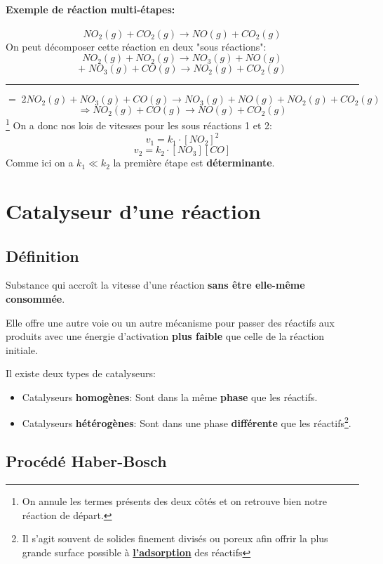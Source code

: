 \documentclass[10pt,a4paper]{book}
\begin{document}
\paragraph{Exemple de réaction multi-étapes:}
\[NO_2(g)+CO_2(g)\longrightarrow NO(g)+CO_2(g)\]
On peut décomposer cette réaction en deux "sous réactions":
\[NO_2(g)+NO_2(g)\longrightarrow NO_3(g)+NO(g) \tag*{1}\]
\[+ \; NO_3(g)+CO(g)\longrightarrow NO_2(g)+CO_2(g) \tag*{2}\]
\hrule
\[= \; 2NO_2(g)+NO_3(g)+CO(g) \longrightarrow NO_3(g)+NO(g)+NO_2(g)+CO_2(g)\]
\[\Rightarrow NO_2(g)+CO(g) \longrightarrow NO(g)+CO_2(g)\]\footnote{On annule les termes présents des deux côtés et on retrouve bien notre réaction de départ.}
On a donc nos lois de vitesses pour les sous réactions 1 et 2:
\[v_1 = k_1 \cdot [NO_2]^2\]
\[v_2 = k_2 \cdot [NO_3][CO]\]
Comme ici on a $k_1 \ll k_2$ la première étape est \textbf{déterminante}.

\section{Catalyseur d'une réaction}

\subsection{Définition}

Substance qui accroît la vitesse d'une réaction \textbf{sans être elle-même consommée}. \par
Elle offre une autre voie ou un autre mécanisme pour passer des réactifs aux produits avec une énergie d'activation \textbf{plus faible} que celle de la réaction initiale. \par
Il existe deux types de catalyseurs:
\begin{itemize}
\item Catalyseurs \textbf{homogènes}: Sont dans la même \textbf{phase} que les réactifs.
\item Catalyseurs \textbf{hétérogènes}: Sont dans une phase \textbf{différente} que les réactifs\footnote{Il s'agit souvent de solides finement divisés ou poreux afin offrir la plus grande surface possible à \href{https://fr.wikipedia.org/wiki/Adsorption}{\textbf{l'adsorption}} des réactifs}.
\end{itemize}

\subsection{Procédé Haber-Bosch}
\end{document}
